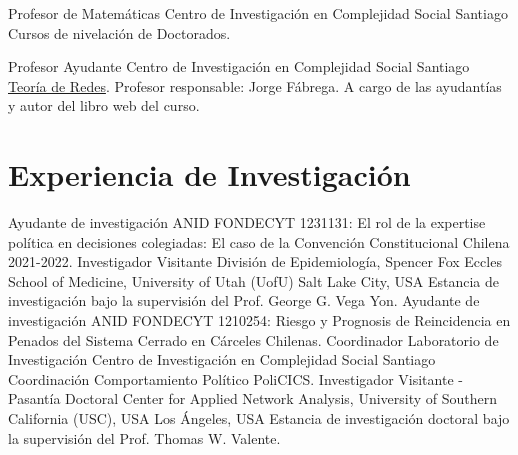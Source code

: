         {Profesor de Matemáticas}
        {Centro de Investigación en Complejidad Social}
        {Santiago}
        {\newline Cursos de nivelación de Doctorados.}
        {}

        {Profesor Ayudante}
        {Centro de Investigación en Complejidad Social}
        {Santiago}
        {\newline \href{https://aoliveram.github.io/Redes-Sociales-2026/}{Teoría de Redes}. Profesor responsable: Jorge Fábrega. A cargo de las ayudantías y autor del libro web del curso.}
        {}


\section{Experiencia de Investigación}

        {Ayudante de investigación}
        {ANID}
        {FONDECYT 1231131:}
        {El rol de la expertise política en decisiones colegiadas: El caso de la Convención Constitucional Chilena 2021-2022.}   %
        {}
        {Investigador Visitante}
        {División de Epidemiología, Spencer Fox Eccles School of Medicine, University of Utah (UofU)}
        {Salt Lake City, USA}
        {\newline Estancia de investigación bajo la supervisión del Prof. George G. Vega Yon.}   %
        {}
        {Ayudante de investigación}
        {ANID}
        {FONDECYT 1210254:}
        {Riesgo y Prognosis de Reincidencia en Penados del Sistema Cerrado en Cárceles Chilenas.}   %
        {}
        {Coordinador Laboratorio de Investigación}
        {Centro de Investigación en Complejidad Social}
        {Santiago}
        {Coordinación Comportamiento Político PoliCICS.}   %
        {}
        {Investigador Visitante - Pasantía Doctoral}
        {Center for Applied Network Analysis, University of Southern California (USC), USA}
        {Los Ángeles, USA}
        {\newline Estancia de investigación doctoral bajo la supervisión del Prof. Thomas W. Valente.}   %
        {}